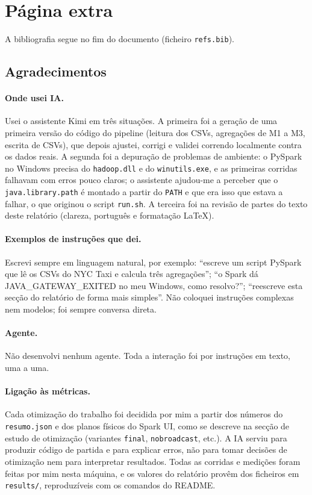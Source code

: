 \documentclass[sigconf]{acmart}
\begin{document}



\appendix
\section*{Página extra}

A bibliografia segue no fim do documento (ficheiro \texttt{refs.bib}).

\subsection*{Agradecimentos}

\paragraph{Onde usei IA.}
Usei o assistente Kimi em três situações. A primeira foi a geração de
uma primeira versão do código do pipeline (leitura dos CSVs, agregações
de M1 a M3, escrita de CSVs), que depois ajustei, corrigi e validei
correndo localmente contra os dados reais. A segunda foi a depuração de
problemas de ambiente: o PySpark no Windows precisa do \texttt{hadoop.dll}
e do \texttt{winutils.exe}, e as primeiras corridas falhavam com erros
pouco claros; o assistente ajudou-me a perceber que o \texttt{java.library.path}
é montado a partir do \texttt{PATH} e que era isso que estava a falhar,
o que originou o script \texttt{run.sh}. A terceira foi na revisão de
partes do texto deste relatório (clareza, português e formatação
LaTeX).

\paragraph{Exemplos de instruções que dei.}
Escrevi sempre em linguagem natural, por exemplo: ``escreve um script
PySpark que lê os CSVs do NYC Taxi e calcula três agregações'';
``o Spark dá JAVA\_GATEWAY\_EXITED no meu Windows, como resolvo?'';
``reescreve esta secção do relatório de forma mais simples''. Não
coloquei instruções complexas nem modelos; foi sempre conversa direta.

\paragraph{Agente.}
Não desenvolvi nenhum agente. Toda a interação foi por instruções
em texto, uma a uma.

\paragraph{Ligação às métricas.}
Cada otimização do trabalho foi decidida por mim a partir dos números
do \texttt{resumo.json} e dos planos físicos do Spark UI, como se descreve
na secção de estudo de otimização (variantes \texttt{final},
\texttt{nobroadcast}, etc.). A IA serviu para produzir código de partida
e para explicar erros, não para tomar decisões de otimização nem para
interpretar resultados. Todas as corridas e medições foram feitas por mim
nesta máquina, e os valores do relatório provêm dos ficheiros em
\texttt{results/}, reproduzíveis com os comandos do README.
\end{document}
